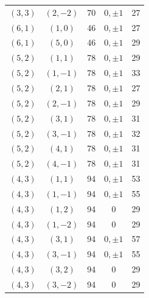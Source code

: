 {\begin{longtable}{ccccr}
$(3,3)$ & $(2,-2)$ & 70 & $0,\pm1$ & 27\\
$(6,1)$ & $(1,0)$ & 46 & $0,\pm1$ & 27\\
$(6,1)$ & $(5,0)$ & 46 & $0,\pm1$ & 29\\
$(5,2)$ & $(1,1)$ & 78 & $0,\pm1$ & 29\\
$(5,2)$ & $(1,-1)$ & 78 & $0,\pm1$ & 33\\
$(5,2)$ & $(2,1)$ & 78 & $0,\pm1$ & 27\\
$(5,2)$ & $(2,-1)$ & 78 & $0,\pm1$ & 29\\
$(5,2)$ & $(3,1)$ & 78 & $0,\pm1$ & 31\\
$(5,2)$ & $(3,-1)$ & 78 & $0,\pm1$ & 32\\
$(5,2)$ & $(4,1)$ & 78 & $0,\pm1$ & 31\\
$(5,2)$ & $(4,-1)$ & 78 & $0,\pm1$ & 31\\
$(4,3)$ & $(1,1)$ & 94 & $0,\pm1$ & 53\\
$(4,3)$ & $(1,-1)$ & 94 & $0,\pm1$ & 55\\
$(4,3)$ & $(1,2)$ & 94 & $0$ & 29\\
$(4,3)$ & $(1,-2)$ & 94 & $0$ & 29\\
$(4,3)$ & $(3,1)$ & 94 & $0,\pm1$ & 57\\
$(4,3)$ & $(3,-1)$ & 94 & $0,\pm1$ & 55\\
$(4,3)$ & $(3,2)$ & 94 & $0$ & 29\\
$(4,3)$ & $(3,-2)$ & 94 & $0$ & 29\\
\bottomrule
\end{longtable}
}
